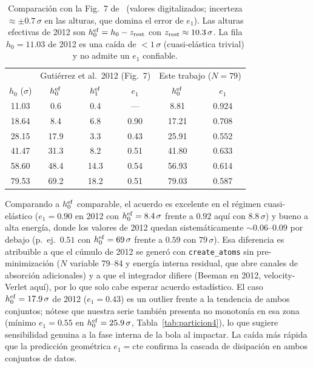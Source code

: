 \documentclass[12pt,a4paper]{article}
\begin{document}
\begin{table}[htbp]
\centering
\small
\caption{Comparación con la Fig.~7 de~\cite{Gutierrez2012} (valores
digitalizados; incerteza $\approx\pm0.7\,\sigma$ en las alturas, que domina
el error de $e_1$). Las alturas efectivas de 2012 son
$h_0^{\rm ef}=h_0-z_{\rm rest}$ con $z_{\rm rest}\approx10.3\,\sigma$.
La fila $h_0=11.03$ de 2012 es una caída de $<1\,\sigma$ (cuasi-elástica
trivial) y no admite un $e_1$ confiable.}
\label{tab:comparacion2012}
\begin{tabular}{c|ccc|cc}
\toprule
 & \multicolumn{3}{c|}{Gutiérrez et al.\ 2012 (Fig.~7)} &
 \multicolumn{2}{c}{Este trabajo ($N=79$)} \\
$h_0$ ($\sigma$) & $h_0^{\rm ef}$ & $h_1^{\rm ef}$ & $e_1$ &
$h_0^{\rm ef}$ & $e_1$ \\
\midrule
11.03 &  0.6 &  0.4 & ---  &  8.81 & 0.924 \\
18.64 &  8.4 &  6.8 & 0.90 & 17.21 & 0.708 \\
28.15 & 17.9 &  3.3 & 0.43 & 25.91 & 0.552 \\
41.47 & 31.3 &  8.2 & 0.51 & 41.80 & 0.633 \\
58.60 & 48.4 & 14.3 & 0.54 & 56.93 & 0.614 \\
79.53 & 69.2 & 18.2 & 0.51 & 79.03 & 0.587 \\
\bottomrule
\end{tabular}
\end{table}

Comparando a $h_0^{\rm ef}$ comparable, el acuerdo es excelente en el
régimen cuasi-elástico ($e_1=0.90$ en 2012 con $h_0^{\rm ef}=8.4\,\sigma$
frente a $0.92$ aquí con $8.8\,\sigma$) y bueno a alta energía, donde los
valores de 2012 quedan sistemáticamente $\sim0.06$--$0.09$ por debajo
(p.~ej.\ $0.51$ con $h_0^{\rm ef}=69\,\sigma$ frente a $0.59$ con
$79\,\sigma$). Esa diferencia es atribuible a que el cúmulo de 2012 se
generó con \texttt{create\_atoms} sin pre-minimización ($N$ variable
79--84 y energía interna residual, que abre canales de absorción
adicionales) y a que el integrador difiere (Beeman en 2012,
velocity-Verlet aquí), por lo que solo cabe esperar acuerdo estadístico.
El caso $h_0^{\rm ef}=17.9\,\sigma$ de 2012 ($e_1=0.43$) es un outlier
frente a la tendencia de ambos conjuntos; nótese que nuestra serie también
presenta no monotonía en esa zona (mínimo $e_1=0.55$ en
$h_0^{\rm ef}=25.9\,\sigma$, Tabla~\ref{tab:particion4}), lo que sugiere
sensibilidad genuina a la fase interna de la bola al impactar.
La caída más rápida que la predicción geométrica $e_1=\mathrm{cte}$
confirma la cascada de disipación en ambos conjuntos de datos.
\end{document}
